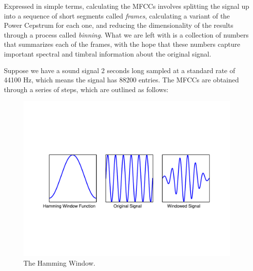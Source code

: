 Expressed in simple terms, calculating the MFCCs involves splitting the signal up into a sequence of
short segments called \emph{frames}, calculating a variant of the Power Cepstrum for each one, 
and reducing the dimensionality of the results through a process called \emph{binning}. What we are
left with is a collection of numbers that summarizes each of the frames, with the hope that these
numbers capture important spectral and timbral information about the original signal.  

Suppose we have a sound signal 2 seconds long sampled at a standard rate of 44100 Hz, which means the
signal has 88200 entries. The  MFCCs are obtained through a series of steps, which are outlined
as follows:
\begin{figure}
\centering
\includegraphics[width=\textwidth]{Hamming.pdf}
\caption{The Hamming Window.}
\label{fourierext:ham}
\end{figure}
